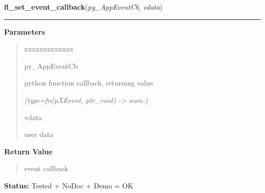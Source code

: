     \label{xformslib:library:fl_set_event_callback}

    \vspace{0.5ex}

\hspace{.8\funcindent}\begin{boxedminipage}{\funcwidth}

    \raggedright \textbf{fl\_set\_event\_callback}(\textit{py\_AppEventCb}, \textit{vdata})

    \vspace{-1.5ex}

    \rule{\textwidth}{0.5\fboxrule}
\setlength{\parskip}{2ex}
\setlength{\parskip}{1ex}
      \textbf{Parameters}
      \vspace{-1ex}

      \begin{quote}
        \begin{Ventry}{xxxxxxxxxxxxx}

          \item[py\_AppEventCb]

          python function callback, returning value

            {\it (type=fn(pXEvent, ptr\_void) -{\textgreater} num.)}

          \item[vdata]

          user data

        \end{Ventry}

      \end{quote}

      \textbf{Return Value}
    \vspace{-1ex}

      \begin{quote}
      event callback

      \end{quote}

\textbf{Status:} Tested + NoDoc + Demo = OK



    \end{boxedminipage}

    \label{xformslib:library:fl_set_idle_callback}

